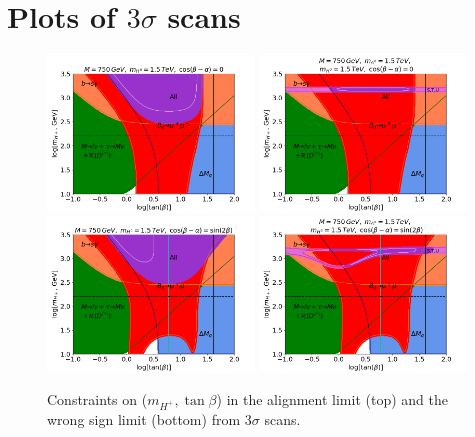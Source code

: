 \documentclass[a4paper,12pt]{article}
\begin{document}
\section{Plots of $3\sigma$ scans}
\begin{figure}[H]
    \centering
    \includegraphics[width=0.49\textwidth]{../global/global_test3sig.png}
    \includegraphics[width=0.49\textwidth]{../global/global_test3sig1.png}
    \includegraphics[width=0.49\textwidth]{../global/global_test3sig2.png}
    \includegraphics[width=0.49\textwidth]{../global/global_test3sig3.png}
    \caption{\label{fig:threesig}Constraints on ($m_{H^+},\tan\beta$) in the alignment limit (top) and the wrong sign limit (bottom) from $3\sigma$ scans. 
}
\end{figure}
\end{document}
